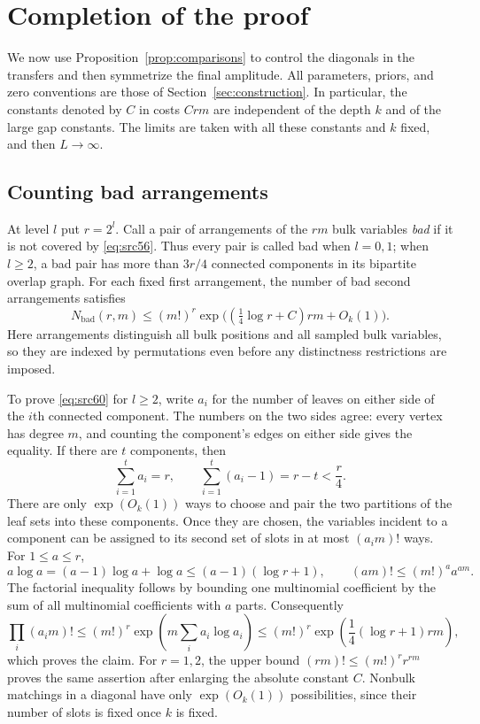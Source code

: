 \section{Completion of the proof}\label{sec:conclusion}

We now use Proposition~\ref{prop:comparisons} to control the diagonals in
the transfers and then symmetrize the final amplitude.  All parameters,
priors, and zero conventions are those of Section~\ref{sec:construction}.
In particular, the constants denoted by $C$ in costs $Crm$ are independent
of the depth $k$ and of the large gap constants.  The limits are taken with
all these constants and $k$ fixed, and then $L\to\infty$.

\subsection{Counting bad arrangements}

At level $l$ put $r=2^l$.  Call a pair of arrangements of the $rm$ bulk
variables \emph{bad} if it is not covered by \eqref{eq:src56}.  Thus every
pair is called bad when $l=0,1$; when $l\ge2$, a bad pair has more than
$3r/4$ connected components in its bipartite overlap graph.  For each
fixed first arrangement, the number of bad second arrangements satisfies
\begin{equation}\label{eq:src60}
 N_{\mathrm{bad}}(r,m)
 \le (m!)^r
       \exp\bigl((\tfrac14\log r+C)rm+O_k(1)\bigr).
\end{equation}
Here arrangements distinguish all bulk positions and all sampled bulk
variables, so they are indexed by permutations even before any
distinctness restrictions are imposed.

To prove \eqref{eq:src60} for $l\ge2$, write $a_i$ for the number of leaves
on either side of the $i$th connected component.  The numbers on the two
sides agree: every vertex has degree $m$, and counting the component's
edges on either side gives the equality.  If there are $t$ components,
then
\[
 \sum_{i=1}^t a_i=r,
 \qquad
 \sum_{i=1}^t(a_i-1)=r-t<\frac r4.
\]
There are only $\exp(O_k(1))$ ways to choose and pair the two partitions
of the leaf sets into these components.  Once they are chosen, the
variables incident to a component can be assigned to its second set of
slots in at most $(a_i m)!$ ways.  For $1\le a\le r$,
\[
 a\log a
  =(a-1)\log a+\log a
  \le(a-1)(\log r+1),
 \qquad
 (am)!\le(m!)^a a^{am}.
\]
The factorial inequality follows by bounding one multinomial
coefficient by the sum of all multinomial coefficients with $a$ parts.
Consequently
\[
 \prod_i(a_i m)!
 \le(m!)^r\exp\left(m\sum_i a_i\log a_i\right)
 \le(m!)^r\exp\left(\frac14(\log r+1)rm\right),
\]
which proves the claim.  For $r=1,2$, the upper bound
$(rm)!\le(m!)^r r^{rm}$ proves the same assertion after enlarging the
absolute constant $C$.  Nonbulk matchings in a diagonal have only
$\exp(O_k(1))$ possibilities, since their number of slots is fixed once
$k$ is fixed.

